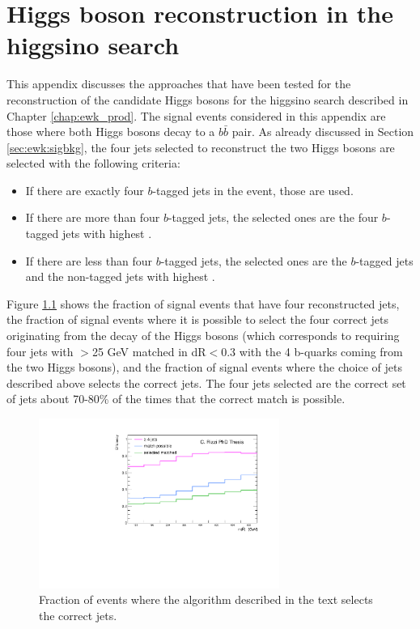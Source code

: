 \chapter{Higgs boson reconstruction in the higgsino search}
\label{app:higgs}

This appendix discusses the approaches that have been tested for the reconstruction of the 
candidate Higgs bosons for the higgsino search described in Chapter \ref{chap:ewk_prod}. 
The signal events considered in this appendix are those where both Higgs bosons decay to a $b\bar{b}$ pair. 
As already discussed in Section \ref{sec:ewk:sigbkg}, the four jets selected to reconstruct the two Higgs bosons 
are selected with the following criteria:

\begin{itemize}
\item If there are exactly four $b$-tagged jets in the event, those are used.
\item If there are more than four $b$-tagged jets, the selected ones are the four $b$-tagged jets with highest \pt.
\item If there are less than four $b$-tagged jets, the selected ones are the $b$-tagged jets and the non-tagged jets with highest \pt.
\end{itemize}

Figure  \ref{fig:h_reco_match_possible}  shows the fraction of signal events that have four reconstructed jets, the fraction 
of signal events where it is possible to select the four correct jets originating from the decay of the Higgs bosons 
(which corresponds to requiring four jets with \pt $>$25 GeV  matched in dR$<$0.3 with the 4 b-quarks coming from the two Higgs bosons), 
and the fraction of signal events where the choice of jets described above selects the correct jets. 
The four jets selected are the correct set of jets about 70-80\% of the times that the correct match is possible. 


\begin{figure}[h]
\centering
\includegraphics[width=0.7\textwidth]{figures/h_reco/match_possible.pdf}
\caption{Fraction of events where the algorithm described in the text selects the correct jets.}
\label{fig:h_reco_match_possible}
\end{figure}

